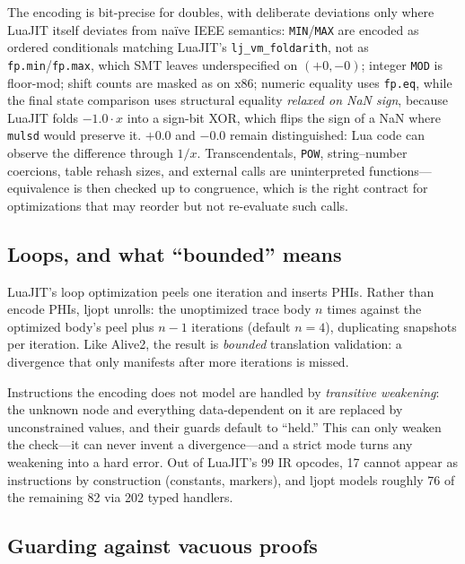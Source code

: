 \documentclass[runningheads]{llncs}
\newif\iffull \fulltrue
\newcommand{\full}[1]{#1}
\newcommand{\brief}[1]{}
\newcommand{\full}[1]{}
\newcommand{\brief}[1]{#1}
\newcommand{\ljopt}{\textsf{ljopt}}
\newcommand{\ir}[1]{\texttt{#1}}
\begin{document}
The encoding is bit-precise for doubles, with deliberate deviations only
where LuaJIT itself deviates from na\"ive IEEE semantics:
\ir{MIN}/\ir{MAX} are encoded as ordered conditionals\full{ matching
LuaJIT's \texttt{lj\_vm\_foldarith}}, not as
\texttt{fp.min}/\texttt{fp.max}, which SMT leaves underspecified on
$(+0,-0)$;
integer \ir{MOD} is floor-mod; shift counts are masked as on x86;
numeric equality uses \texttt{fp.eq}, while the final state comparison
uses structural equality \emph{relaxed on NaN sign}, because LuaJIT folds
$-1.0 \cdot x$ into a sign-bit XOR\full{, which flips the sign of a NaN
where \texttt{mulsd} would preserve it}. $+0.0$ and $-0.0$ remain
distinguished\full{: Lua code can observe the difference through $1/x$}.
Transcendentals, \ir{POW}, string--number coercions\full{, table rehash
sizes}, and external calls are uninterpreted functions---equivalence is
then checked up to congruence\full{, which is the right contract for
optimizations that may reorder but not re-evaluate such calls}.

\subsection{Loops, and what ``bounded'' means}

LuaJIT's loop optimization peels one iteration and inserts PHIs. Rather than
encode PHIs, \ljopt{} unrolls: the unoptimized trace body $n$ times against
the optimized body's peel plus $n{-}1$ iterations (default $n{=}4$),
duplicating snapshots per iteration. Like Alive2, the result is
\emph{bounded} translation validation: a divergence that only manifests
after more iterations is missed.

Instructions the encoding does not model are handled by \emph{transitive
weakening}: the unknown node and everything data-dependent on it are
replaced by unconstrained values, and their guards default to ``held.''
This can only weaken the check---it can never invent a divergence---and a
strict mode turns any weakening into a hard error.\full{ Out of LuaJIT's 99
IR opcodes, 17 cannot appear as instructions by construction (constants,
markers), and} \brief{\ljopt{} models roughly 76 of LuaJIT's 82 instruction
opcodes via 202 typed handlers.}\full{\ljopt{} models roughly 76 of the
remaining 82 via 202 typed handlers.}

\iffull
\subsection{Guarding against vacuous proofs}\label{sec:vacuity}
\end{document}
